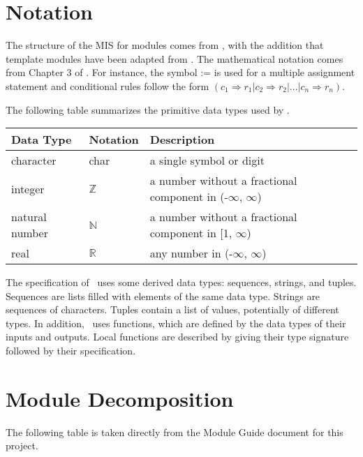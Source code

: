 \documentclass[12pt, titlepage]{article}
\begin{document}
\section{Notation}

The structure of the MIS for modules comes from \citet{HoffmanAndStrooper1995},
with the addition that template modules have been adapted from
\cite{GhezziEtAl2003}.  The mathematical notation comes from Chapter 3 of
\citet{HoffmanAndStrooper1995}.  For instance, the symbol := is used for a
multiple assignment statement and conditional rules follow the form $(c_1
\Rightarrow r_1 | c_2 \Rightarrow r_2 | ... | c_n \Rightarrow r_n )$.

The following table summarizes the primitive data types used by \progname. 

\begin{center}
\renewcommand{\arraystretch}{1.2}
\noindent 
\begin{tabular}{l l p{7.5cm}} 
\toprule 
\textbf{Data Type} & \textbf{Notation} & \textbf{Description}\\ 
\midrule
character & char & a single symbol or digit\\
integer & $\mathbb{Z}$ & a number without a fractional component in (-$\infty$, $\infty$) \\
natural number & $\mathbb{N}$ & a number without a fractional component in [1, $\infty$) \\
real & $\mathbb{R}$ & any number in (-$\infty$, $\infty$)\\
\bottomrule
\end{tabular} 
\end{center}

\noindent
The specification of \progname \ uses some derived data types: sequences, strings, and
tuples. Sequences are lists filled with elements of the same data type. Strings
are sequences of characters. Tuples contain a list of values, potentially of
different types. In addition, \progname \ uses functions, which
are defined by the data types of their inputs and outputs. Local functions are
described by giving their type signature followed by their specification.

\section{Module Decomposition}

The following table is taken directly from the Module Guide document for this project.
\end{document}
